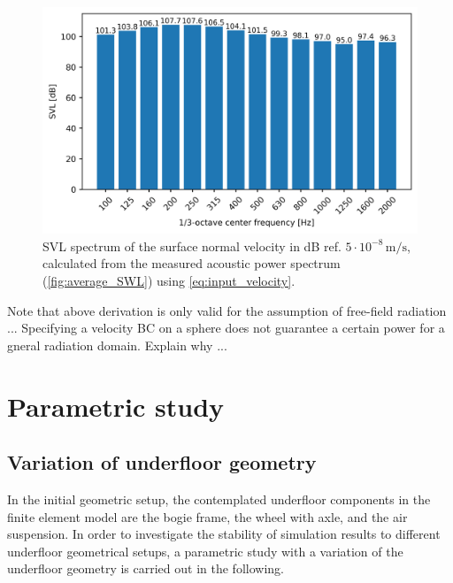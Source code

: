 \begin{figure}
	\centering
	\includegraphics{fig/chap4/input_SVL.png}
	\caption{SVL spectrum of the surface normal velocity in dB ref. $5\cdot10^{-8}\,\text{m/s}$, calculated from the measured acoustic power spectrum (\cref{fig:average_SWL}) using \cref{eq:input_velocity}.}
	\label{fig:input_SVL}
\end{figure}

Note that above derivation is only valid for the assumption of free-field radiation ... Specifying a velocity BC on a sphere does not guarantee a certain power for a gneral radiation domain. Explain why ...

\newpage
\section{Parametric study}
\label{section:parametric_study}
\subsection{Variation of underfloor geometry}
\label{section:variation_geometry}

In the initial geometric setup, the contemplated underfloor components in the finite element model are the bogie frame, the wheel with axle, and the air suspension. In order to investigate the stability of simulation results to different underfloor geometrical setups, a parametric study with a variation of the underfloor geometry is carried out in the following.

